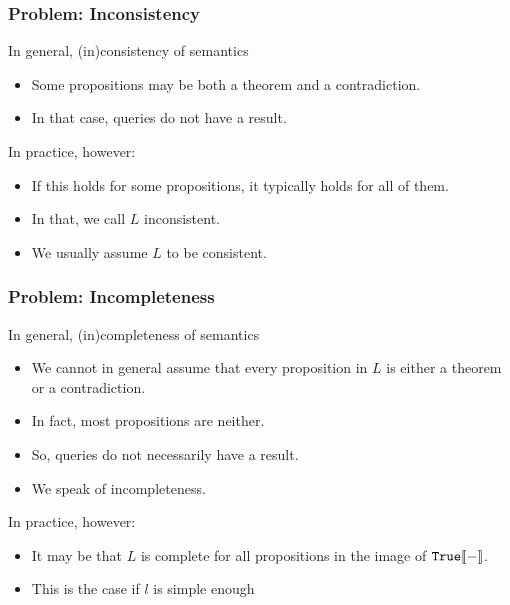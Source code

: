 \begin{frame}\frametitle{Problem: Inconsistency}
In general, (in)consistency of semantics
\begin{itemize}
\item Some propositions may be both a theorem and a contradiction.
\item In that case, queries do not have a result.
\end{itemize}

In practice, however:
\begin{itemize}
\item If this holds for some propositions, it typically holds for all of them.
\item In that, we call $L$ inconsistent.
\item We usually assume $L$ to be consistent.
\end{itemize}
\end{frame}


\begin{frame}\frametitle{Problem: Incompleteness}
In general, (in)completeness of semantics
\begin{itemize}
\item We cannot in general assume that every proposition in $L$ is either a theorem or a contradiction.
\item In fact, most propositions are neither.
\item So, queries do not necessarily have a result.
\item We speak of incompleteness. 
\end{itemize}

In practice, however:
\begin{itemize}
\item It may be that $L$ is complete for all propositions in the image of $\mathtt{True}\llbracket -\rrbracket$.
\item This is the case if $l$ is simple enough 
\end{itemize}
\end{frame}

